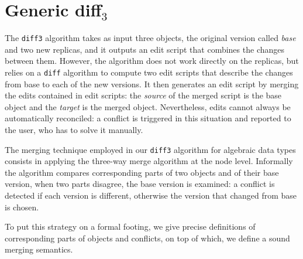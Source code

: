 \documentclass{sigplanconf}
\theoremstyle{plain}
\begin{document}
\section{Generic diff$_3$}
The \texttt{diff3} algorithm takes as input three objects, the
original version called \emph{base} and two new replicas, and it
outputs an edit script that combines the changes between them.
%
However, the algorithm does not work directly on the replicas, but
relies on a \texttt{diff} algorithm to compute two edit scripts that
describe the changes from base to each of the new versions.
%
It then generates an edit script by merging the edits contained in
edit scripts: the \emph{source} of the merged script is the base
object and the \emph{target} is the merged object.
%
Nevertheless, edits cannot always be automatically reconciled: a
conflict is triggered in this situation and reported to the user, who
has to solve it manually. 
%
		
%
The merging technique employed in our \texttt{diff3} algorithm for
algebraic data types consists in applying the three-way merge
algorithm at the node level.
%
Informally the algorithm compares corresponding parts of two objects
and of their base version, when two parts disagree, the base version
is examined: a conflict is detected if each version is different,
otherwise the version that changed from base is chosen.
	
To put this strategy on a formal footing, we give precise definitions
of corresponding parts of objects and conflicts, on top of which, we
define a sound merging semantics.
\end{document}

